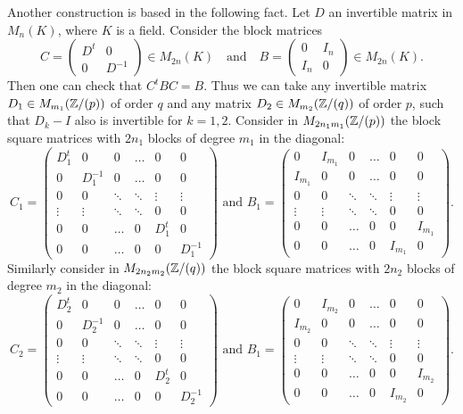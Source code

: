 Another construction is based in the following fact. Let $D$ an invertible matrix in $M_n(K)$, where $K$ is a field. Consider the block matrices
$$C=\left(\begin{array}{cc}
D^t&0\\
0&D^{-1}\end{array}\right)\in M_{2n}(K)\quad\mbox{and}\quad B=\left(\begin{array}{cc}
0&I_n\\
I_n&0\end{array}\right)\in M_{2n}(K).$$
Then one can check that $C^tBC=B$.     
Thus we can take any invertible matrix $D_1\in M_{m_1}(\mathbb{Z}/(p))$ of order $q$ and any matrix $D_2\in M_{m_2}(\mathbb{Z}/(q))$ of order $p$, such that $D_k-I$ also is invertible for $k=1,2$. 
Consider in $M_{2n_1m_1}(\mathbb{Z}/(p))$ the block square matrices with $2n_1$ blocks of degree $m_1$ in the diagonal:
$$C_1=\left(\begin{array}{cccccc}
	D_1^t&0&0&\ldots &0&0\\
	0&D_1^{-1}&0&\ldots &0&0\\
	0&0&\ddots &\ddots &\vdots&\vdots \\
	\vdots&\vdots&\ddots&\ddots&0&0\\
	0&0&\ldots&0&D_1^t&0\\
    0&0&\ldots&0&0&D_1^{-1}\end{array}\right)\mbox{ and } B_1=\left(\begin{array}{cccccc}
	0&I_{m_1}&0&\ldots &0&0\\
	I_{m_1}&0&0&\ldots &0&0\\
	0&0&\ddots&\ddots&\vdots&\vdots\\
	\vdots&\vdots &\ddots &\ddots &0&0\\
	0&0&\ldots&0&0&I_{m_1}\\
	0&0&\ldots&0&I_{m_1}&0
\end{array}\right).$$
Similarly consider in $M_{2n_2m_2}(\mathbb{Z}/(q))$ the block square matrices with $2n_2$ blocks of degree $m_2$ in the diagonal:
$$C_2=\left(\begin{array}{cccccc}
	D_2^t&0&0&\ldots &0&0\\
	0&D_2^{-1}&0&\ldots &0&0\\
	0&0&\ddots &\ddots &\vdots&\vdots \\
	\vdots&\vdots&\ddots&\ddots&0&0\\
	0&0&\ldots&0&D_2^t&0\\
	0&0&\ldots&0&0&D_2^{-1}\end{array}\right)\mbox{ and } B_1=\left(\begin{array}{cccccc}
	0&I_{m_2}&0&\ldots &0&0\\
	I_{m_2}&0&0&\ldots &0&0\\
	0&0&\ddots&\ddots&\vdots&\vdots\\
	\vdots&\vdots &\ddots &\ddots &0&0\\
	0&0&\ldots&0&0&I_{m_2}\\
	0&0&\ldots&0&I_{m_2}&0
\end{array}\right).$$
